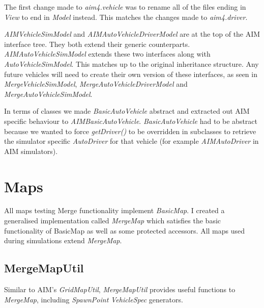 \begin{appendices}
The first change made to \emph{aim4.vehicle} was to rename all of the files ending in \emph{View} to end in \emph{Model} instead. This matches the changes made to \emph{aim4.driver}.

\emph{AIMVehicleSimModel} and \emph{AIMAutoVehicleDriverModel} are at the top of the AIM interface tree. They both extend their generic counterparts. \emph{AIMAutoVehicleSimModel} extends these two interfaces along with \emph{AutoVehicleSimModel}. This matches up to the original inheritance structure. Any future vehicles will need to create their own version of these interfaces, as seen in \emph{MergeVehicleSimModel}, \emph{MergeAutoVehicleDriverModel} and \emph{MergeAutoVehicleSimModel}. 

In terms of classes we made \emph{BasicAutoVehicle} abstract and extracted out AIM specific behaviour to \emph{AIMBasicAutoVehicle}. \emph{BasicAutoVehicle} had to be abstract because we wanted to force \emph{getDriver()} to be overridden in subclasses to retrieve the simulator specific \emph{AutoDriver} for that vehicle (for example \emph{AIMAutoDriver} in AIM simulators). 

\FloatBarrier
\section{Maps}
\label{sec:Maps}
All maps testing Merge functionality implement \emph{BasicMap}. I created a generalised implementation called \emph{MergeMap} which satisfies the basic functionality of BasicMap as well as some protected accessors. All maps used during simulations extend \emph{MergeMap}.

\subsection{MergeMapUtil}
\label{sec:MergeMapUtil}
Similar to AIM's \emph{GridMapUtil}, \emph{MergeMapUtil} provides useful functions to \emph{MergeMap}, including \emph{SpawnPoint} \emph{VehicleSpec} generators.

\end{appendices}